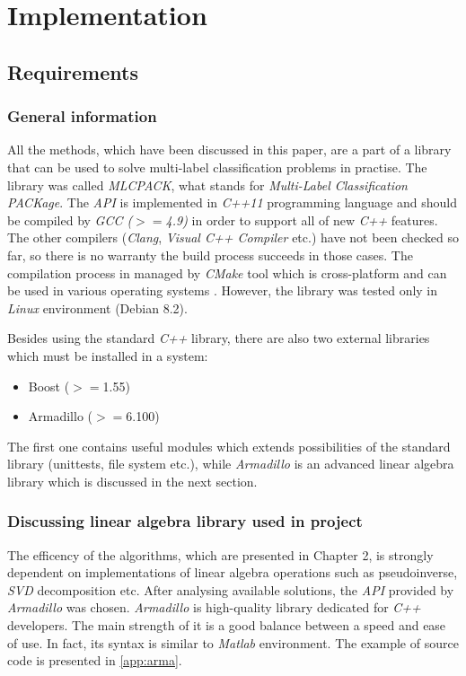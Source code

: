 \chapter{Implementation}

\section{Requirements}

\subsection{General information}
All the methods, which have been discussed in this paper, are a part of a library that can be used to solve multi-label classification problems in practise. The library was called \textit{MLCPACK}, what stands for \textit{Multi-Label Classification PACKage}. The \textit{API} is implemented in \textit{C++11} programming language and should be compiled by \textit{GCC ($>=$4.9)} in order to support all of new \textit{C++} features. The other compilers (\textit{Clang}, \textit{Visual C++ Compiler} etc.) have not been checked so far, so there is no warranty the build process succeeds in those cases.  The compilation process in managed by \textit{CMake} tool which is cross-platform and can be used in various operating systems \cite{CMake}. However, the library was tested only in \textit{Linux} environment (Debian 8.2). 

Besides using the standard \textit{C++} library, there are also two external libraries which must be installed in a system: 

\begin{itemize}
    \item Boost ($>=$1.55)
    \item Armadillo ($>=$6.100)
\end{itemize}
The first one contains useful modules which extends possibilities of the standard library (unittests, file system etc.), while \textit{Armadillo} is an advanced linear algebra library which is discussed in the next section.  


\subsection{Discussing linear algebra library used in project}

The efficency of the algorithms, which are presented in Chapter 2, is strongly dependent on implementations of linear algebra operations such as pseudoinverse, \textit{SVD} decomposition etc. After analysing available solutions, the \textit{API} provided by \textit{Armadillo} was chosen. \textit{Armadillo} is high-quality library dedicated for \textit{C++} developers. The main strength of it is a good balance between a speed and ease of use. In fact, its syntax is similar to \textit{Matlab} environment. The example of source code is presented in \cref{app:arma}.

